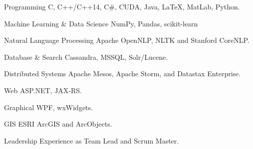 


\begin{cvskills}


\cvskill
{Programming} %
{C, C++/C++14, C\#, CUDA, Java, \LaTeX, MatLab, Python.} %


\cvskill
{Machine Learning \& Data Science} %
{NumPy, Pandas, scikit-learn} %


\cvskill
{Natural Language Processing} %
{Apache OpenNLP, NLTK and Stanford CoreNLP.} %


\cvskill
{Database \& Search} %
{Cassandra, MSSQL, Solr/Lucene.} %


\cvskill
{Distributed Systems} %
{Apache Mesos, Apache Storm, and Datastax Enterprise.} %


\cvskill
{Web} %
{ASP.NET, JAX-RS.} %


\cvskill
{Graphical} %
{WPF, wxWidgets.} %


\cvskill
{GIS} %
{ESRI ArcGIS and ArcObjects.} %


\cvskill
{Leadership} %
{Experience as Team Lead and Scrum Master.} %


\end{cvskills}